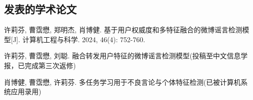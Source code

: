 \begin{resume}

  \section*{发表的学术论文} %

  \begin{enumerate}[label={[\arabic*]}]
  \addtolength{\itemsep}{-.36\baselineskip}%
  \item 许莉芬, 曹霑懋, 郑明杰, 肖博健. 基于用户权威度和多特征融合的微博谣言检测模型[J]. 计算机工程与科学. 2024,  46(4): 752-760.
    
  \item 许莉芬, 曹霑懋, 刘聪. 融合转发用户特征的微博谣言检测模型(投稿至中文信息学报，已完成第三次返修)

  \item 肖博健, 曹霑懋, 许莉芬. 多任务学习用于不良言论与个体特征检测(已被计算机系统应用录用)
\end{enumerate}
\end{resume}
